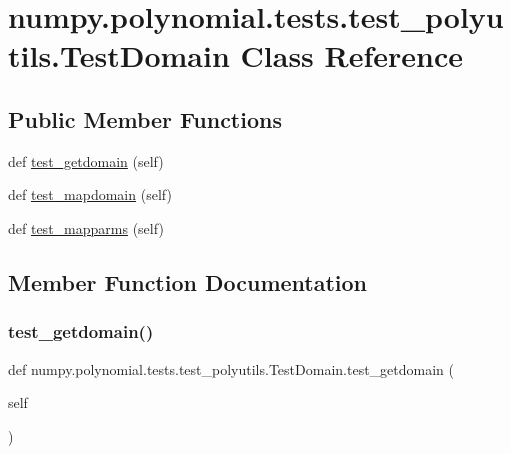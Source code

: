 \hypertarget{classnumpy_1_1polynomial_1_1tests_1_1test__polyutils_1_1TestDomain}{}\section{numpy.\+polynomial.\+tests.\+test\+\_\+polyutils.\+Test\+Domain Class Reference}
\label{classnumpy_1_1polynomial_1_1tests_1_1test__polyutils_1_1TestDomain}
\subsection*{Public Member Functions}
\begin{DoxyCompactItemize}
\item 
def \hyperlink{classnumpy_1_1polynomial_1_1tests_1_1test__polyutils_1_1TestDomain_a3195ca8d88fc66963602cdb2a4a6e921}{test\+\_\+getdomain} (self)
\item 
def \hyperlink{classnumpy_1_1polynomial_1_1tests_1_1test__polyutils_1_1TestDomain_aa6ba07dbb576ac4a8f04e6a5e1097afc}{test\+\_\+mapdomain} (self)
\item 
def \hyperlink{classnumpy_1_1polynomial_1_1tests_1_1test__polyutils_1_1TestDomain_a24d74d421c343ff5af87b47af62d6d56}{test\+\_\+mapparms} (self)
\end{DoxyCompactItemize}


\subsection{Member Function Documentation}
\mbox{\label{classnumpy_1_1polynomial_1_1tests_1_1test__polyutils_1_1TestDomain_a3195ca8d88fc66963602cdb2a4a6e921}} 
\subsubsection{\texorpdfstring{test\+\_\+getdomain()}{test\_getdomain()}}
{\footnotesize\ttfamily def numpy.\+polynomial.\+tests.\+test\+\_\+polyutils.\+Test\+Domain.\+test\+\_\+getdomain (\begin{DoxyParamCaption}\item[{}]{self }\end{DoxyParamCaption})}

